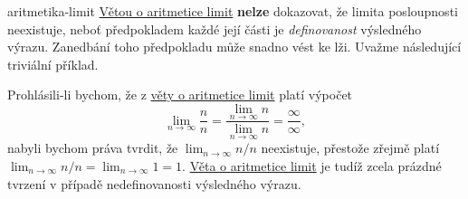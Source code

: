 \begin{warning}{}{aritmetika-limit}
 \hyperref[thm:aritmetika-limit]{Větou o aritmetice limit} \textbf{nelze}
 dokazovat, že limita posloupnosti neexistuje, neboť předpokladem každé její
 části je \emph{definovanost} výsledného výrazu. Zanedbání toho předpokladu může
 snadno vést ke lži. Uvažme následující triviální příklad.

 Prohlásili-li bychom, že z \hyperref[thm:aritmetika-limit]{věty o aritmetice
 limit} platí výpočet
 \[
  \lim_{n \to \infty} \frac{n}{n} = \frac{\lim_{n \to \infty} n}{\lim_{n \to
  \infty} n} = \frac{\infty}{\infty},
 \]
 nabyli bychom práva tvrdit, že $\lim_{n \to \infty} n / n$ neexistuje, přestože
 zřejmě platí $\lim_{n \to \infty} n / n = \lim_{n \to \infty} 1 = 1$.
 \hyperref[thm:aritmetika-limit]{Věta o aritmetice limit} je tudíž zcela prázdné
 tvrzení v případě nedefinovanosti výsledného výrazu.
\end{warning}

